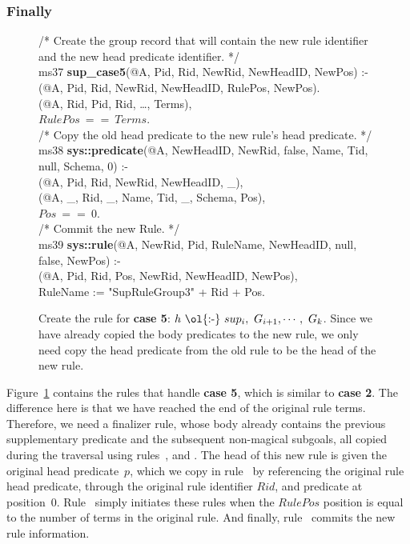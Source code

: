 \subsubsection{Finally}

\begin{figure}[!t]
\ssp
\centering
\begin{boxedminipage}{\linewidth}
/* Create the group record that will contain the new rule identifier \\
and the new head predicate identifier. */ \\
ms37 {\bf sup\_case5}(@A, Pid, Rid, NewRid, NewHeadID, NewPos) :- \\
(@A, Pid, Rid, NewRid, NewHeadID, RulePos, NewPos). \\
(@A, Rid, Pid, Rid, \ldots, Terms), \\
\datalogspace $RulePos\ ==\ Terms$. \\
	
/* Copy the old head predicate to the new rule's head predicate. */ \\
ms38 {\bf sys::predicate}(@A, NewHeadID, NewRid, false, Name, Tid, null, Schema, 0) :- \\
(@A, Pid, Rid, NewRid, NewHeadID, \_), \\
(@A, \_, Rid, \_, Name, Tid, \_, Schema, Pos), \\
\datalogspace $Pos\ ==\ 0$. \\
	
/* Commit the new Rule. */ \\
ms39 {\bf sys::rule}(@A, NewRid, Pid, RuleName, NewHeadID, null, false, NewPos) :- \\
(@A, Pid, Rid, Pos, NewRid, NewHeadID, NewPos), \\
\datalogspace RuleName := "SupRuleGroup3" + Rid + Pos.

\end{boxedminipage}
\caption{\label{ch:magic:fig:rewrite9} 
Create the rule for {\bf case 5}: $h\ \text{\ol{:-}}\ sup_i,\ G_{i+1}, \cdots,\ G_k$. 
Since we have already copied the body predicates to the new rule, we only
need copy the head predicate from the old rule to be the head of the new rule.}
\end{figure}

Figure~\ref{ch:magic:fig:rewrite9} contains the rules that handle {\bf case 5},
which is similar to {\bf case 2}.  The difference here is that we have reached
the end of the original rule terms.  Therefore, we need a finalizer rule, whose
body already contains the previous supplementary predicate and the subsequent
non-magical subgoals, all copied during the  traversal using
rules~,  and .  The head of this new rule is given the
original head predicate~$p$, which we copy in rule~ by referencing the
original rule head predicate, through the original rule identifier $Rid$, and
predicate at position~$0$.  Rule~ simply initiates these rules when the
$RulePos$ position is equal to the number of terms in the original rule.  And
finally, rule~ commits the new rule information.

